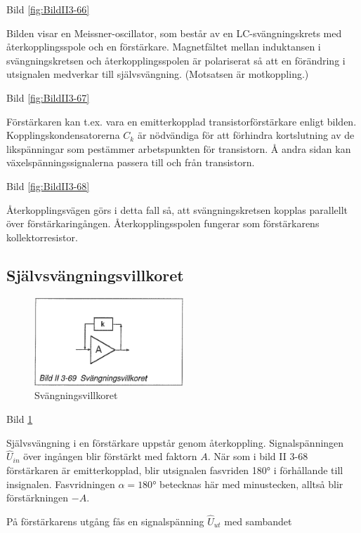 Bild \ref{fig:BildII3-66}

Bilden visar en Meissner-oscillator, som består av en
LC-svängningskrets med återkopplingsspole och en
förstärkare. Magnetfältet mellan induktansen i svängningskretsen och
återkopplingsspolen är polariserat så att en förändring i utsignalen
medverkar till självsvängning. (Motsatsen är motkoppling.)

Bild \ref{fig:BildII3-67}

Förstärkaren kan t.ex. vara en emitterkopplad transistorförstärkare
enligt bilden.  Kopplingskondensatorerna \(C_k\) är nödvändiga för att
förhindra kortslutning av de likspänningar som pestämmer arbetspunkten
för transistorn. Å andra sidan kan växelspänningssignalerna passera
till och från transistorn.

Bild \ref{fig:BildII3-68}

Återkopplingsvägen görs i detta fall så, att svängningskretsen kopplas
parallellt över förstärkaringången. Återkopplingsspolen fungerar som
förstärkarens kollektorresistor.

\subsection{Självsvängningsvillkoret}

\begin{figure}
\includegraphics[width=0.5\textwidth]{images/bild_2_3-69}
\caption{Svängningsvillkoret}
\label{fig:BildII3-69}
\end{figure}

Bild \ref{fig:BildII3-69}

Självsvängning i en förstärkare uppstår genom
återkoppling. Signalspänningen \(\hat{U}_{in}\) över ingången blir
förstärkt med faktorn \(A\). När som i bild II 3-68 förstärkaren är
emitterkopplad, blir utsignalen fasvriden 180° i förhållande till
insignalen. Fasvridningen \(\alpha=180°\) betecknas här med
minustecken, alltså blir förstärkningen \(-A\).

På förstärkarens utgång fås en signalspänning \(\hat{U}_{ut}\) med
sambandet

